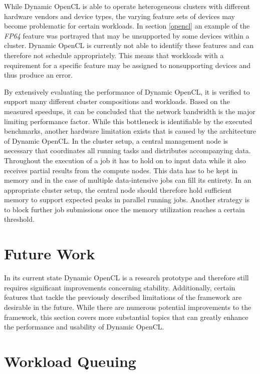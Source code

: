 While Dynamic OpenCL is able to operate heterogeneous clusters with different hardware vendors and device types, the varying feature sets of devices may become problematic for certain workloads. In section \ref{opencl} an example of the \textit{FP64} feature was portrayed that may be unsupported by some devices within a cluster. Dynamic OpenCL is currently not able to identify these features and can therefore not schedule appropriately. This means that workloads with a requirement for a specific feature may be assigned to nonsupporting devices and thus produce an error.

By extensively evaluating the performance of Dynamic OpenCL, it is verified to support many different cluster compositions and workloads. Based on the measured speedups, it can be concluded that the network bandwidth is the major limiting performance factor. While this bottleneck is identifiable by the executed benchmarks, another hardware limitation exists that is caused by the architecture of Dynamic OpenCL. In the cluster setup, a central management node is necessary that coordinates all running tasks and distributes accompanying data. Throughout the execution of a job it has to hold on to input data while it also receives partial results from the compute nodes. This data has to be kept in memory and in the case of multiple data-intensive jobs can fill its entirety. In an appropriate cluster setup, the central node should therefore hold sufficient memory to support expected peaks in parallel running jobs. Another strategy is to block further job submissions once the memory utilization reaches a certain threshold.

\section{Future Work}
\label{future_work}
In its current state Dynamic OpenCL is a research prototype and therefore still requires significant improvements concerning stability. Additionally, certain features that tackle the previously described limitations of the framework are desirable in the future. While there are numerous potential improvements to the framework, this section covers more substantial topics that can greatly enhance the performance and usability of Dynamic OpenCL.

\section*{Workload Queuing}

